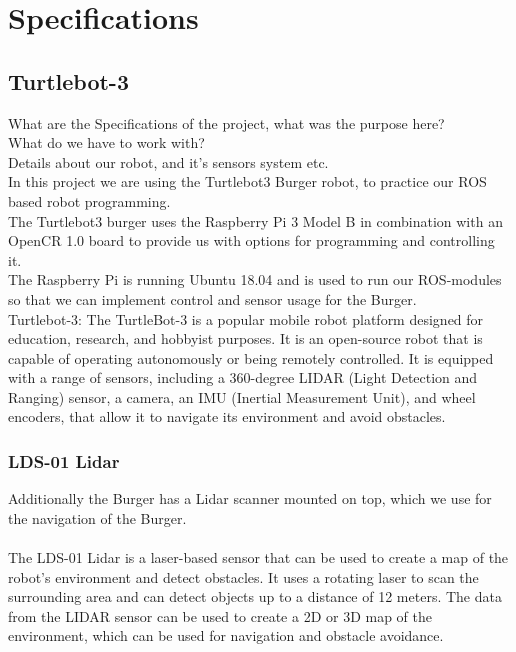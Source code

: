 \documentclass{article}
\begin{document}
 \addtocounter{section}{1}
\section*{Specifications}
\subsection*{Turtlebot-3}
What are the Specifications of the project, what was the purpose here?\\
What do we have to work with?\\
Details about our robot, and it's sensors system etc.\\

In this project we are using the Turtlebot3 Burger robot, to practice our ROS based robot programming.\\
The Turtlebot3 burger uses the Raspberry Pi 3 Model B in combination with an OpenCR 1.0 board to 
provide us with options for programming and controlling it. \\
The Raspberry Pi is running Ubuntu 18.04 and is used to run our ROS-modules so that we can 
implement control and sensor usage for the Burger.\\
Turtlebot-3: The TurtleBot-3 is a popular mobile robot platform designed for education, research, and hobbyist purposes.
It is an open-source robot that is capable of operating autonomously or being remotely controlled.
It is equipped with a range of sensors, including a 360-degree LIDAR (Light Detection and Ranging) sensor, 
a camera, an IMU (Inertial Measurement Unit), and wheel encoders, that allow it to navigate its environment and avoid obstacles.
\\

\subsubsection*{LDS-01 Lidar}
Additionally the Burger has a Lidar scanner mounted on top, which we use for the navigation of the Burger.\\
\\
The LDS-01 Lidar is a laser-based sensor that can be used to create a map of the robot's environment
and detect obstacles. It uses a rotating laser to scan the surrounding area and can detect objects up to a
distance of 12 meters. The data from the LIDAR sensor can be used to create a 2D or 3D map of the environment,
which can be used for navigation and obstacle avoidance.\\
\end{document}
